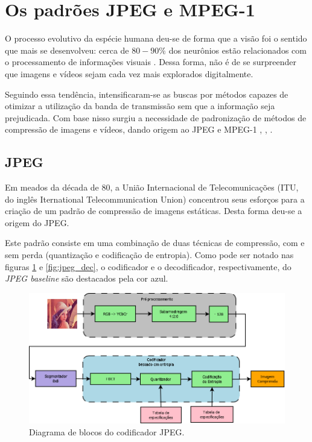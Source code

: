 \section{Os padrões JPEG e MPEG-1}
\label{JPEGeMPEG}

O processo evolutivo da espécie humana deu-se de forma que a visão foi o sentido que mais se desenvolveu: cerca de $ 80-90\% $ dos neurônios estão relacionados com o processamento de informações visuais \cite{Young1991}. Dessa forma, não é de se surpreender que imagens e vídeos sejam cada vez mais explorados digitalmente.

Seguindo essa tendência, intensificaram-se as buscas por métodos capazes de otimizar a utilização da banda de transmissão sem que a informação seja prejudicada. Com base nisso surgiu a necessidade de padronização de métodos de compressão de imagens e vídeos, dando origem ao JPEG \cite{international1993ccitt}  e MPEG-1 \cite{telecommunication1993itu}, \cite{Bialkowski:2007:FVT:1290871.1290876}, \cite{1218189}.

\subsection{JPEG}
\label{jpeg}

Em meados da década de $ 80 $, a União Internacional de Telecomunicações (ITU, do inglês Iternational Telecommunication Union) concentrou seus esforços para a criação de um padrão de compressão de imagens estáticas. Desta forma deu-se a origem do JPEG.

Este padrão consiste em uma combinação de duas técnicas de compressão, com e sem perda (quantização e codificação de entropia). Como pode ser notado nas figuras \ref{fig:jpeg_enc} e \ref{fig:jpeg_dec}, o codificador e o decodificador, respectivamente, do \textit{JPEG baseline} \cite{Gonzalez2006} são destacados pela cor azul.

\begin{figure}[!ht]
  \begin{center}
    \includegraphics[scale=0.35]{./Figures/png/jpeg_encoder.png}
      \caption{Diagrama de blocos do codificador JPEG.}
      \label{fig:jpeg_enc}
  \end{center}
\end{figure}

